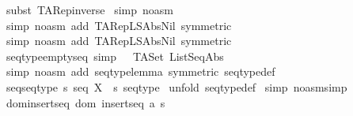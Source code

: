 \begin{isabellebody}
\isamarkupfalse%
\ {\isacharparenleft}subst\ TARep{\isacharunderscore}inverse{\isacharparenright}\isanewline
{}\isamarkupfalse%
\ {\isacharparenleft}simp\ {\isacharparenleft}no{\isacharunderscore}asm{\isacharparenright}{\isacharparenright}\isanewline
{}\isamarkupfalse%
\ {\isacharparenleft}simp\ {\isacharparenleft}no{\isacharunderscore}asm{\isacharparenright}\ add{\isacharcolon}\ TARep{\isacharunderscore}LSAbs{\isacharunderscore}Nil\ {\isacharbrackleft}symmetric{\isacharbrackright}{\isacharparenright}\isanewline
{}\isamarkupfalse%
\ {\isacharparenleft}simp\ {\isacharparenleft}no{\isacharunderscore}asm{\isacharparenright}\ add{\isacharcolon}\ TARep{\isacharunderscore}LSAbs{\isacharunderscore}Nil\ {\isacharbrackleft}symmetric{\isacharbrackright}{\isacharparenright}\isanewline
{}\isamarkupfalse%
%
\endisatagproof
{\isafoldproof}%
%
\isadelimproof
\isanewline
%
\endisadelimproof
\isanewline
{}\isamarkupfalse%
\ seqtype{\isacharunderscore}emptyseq\ {\isacharbrackleft}simp{\isacharbrackright}{\isacharcolon}\ {\isachardoublequoteopen}{\isacharpercent}{\isacharless}{\isacharpercent}{\isachargreater}\ {\isacharcolon}\ TASet\ ListSeqAbs{\isachardoublequoteclose}\isanewline
%
\isadelimproof
%
\endisadelimproof
%
\isatagproof
{}\isamarkupfalse%
\ {\isacharparenleft}simp\ {\isacharparenleft}no{\isacharunderscore}asm{\isacharparenright}\ add{\isacharcolon}\ seqtype{\isacharunderscore}lemma\ {\isacharbrackleft}symmetric{\isacharbrackright}\ seqtype{\isacharunderscore}def{\isacharparenright}\isanewline
{}\isamarkupfalse%
%
\endisatagproof
{\isafoldproof}%
%
\isadelimproof
\isanewline
%
\endisadelimproof
\isanewline
{}\isamarkupfalse%
\ seq{\isacharunderscore}seqtype{\isacharcolon}\ {\isachardoublequoteopen}s{\isacharcolon}\ seq\ X\ {\isacharequal}{\isacharequal}{\isachargreater}\ s{\isacharcolon}\ seqtype{\isachardoublequoteclose}\isanewline
%
\isadelimproof
%
\endisadelimproof
%
\isatagproof
{}\isamarkupfalse%
\ {\isacharparenleft}unfold\ seqtype{\isacharunderscore}def{\isacharparenright}\isanewline
{}\isamarkupfalse%
\ {\isacharparenleft}simp\ {\isacharparenleft}no{\isacharunderscore}asm{\isacharunderscore}simp{\isacharparenright}{\isacharparenright}\isanewline
{}\isamarkupfalse%
%
\endisatagproof
{\isafoldproof}%
%
\isadelimproof
\isanewline
%
\endisadelimproof
\isanewline
{}\isamarkupfalse%
\ dom{\isacharunderscore}insertseq{\isacharcolon}\ {\isachardoublequoteopen}{\isacharparenleft}dom\ {\isacharparenleft}insertseq\ a\ s{\isacharparenright}{\isacharparenright}\ {\isacharequal}\ \ \isanewline

\end{isabellebody}
